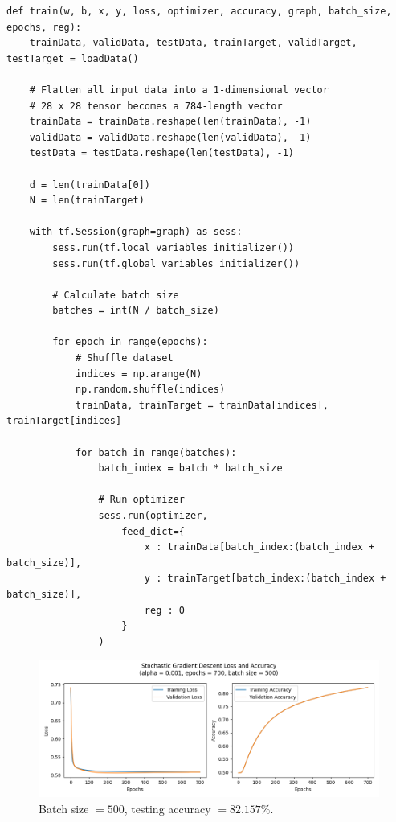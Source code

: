 \documentclass[letter]{article}
\begin{document}
\begin{lstlisting}
def train(w, b, x, y, loss, optimizer, accuracy, graph, batch_size, epochs, reg):
    trainData, validData, testData, trainTarget, validTarget, testTarget = loadData()

    # Flatten all input data into a 1-dimensional vector
    # 28 x 28 tensor becomes a 784-length vector
    trainData = trainData.reshape(len(trainData), -1)
    validData = validData.reshape(len(validData), -1)
    testData = testData.reshape(len(testData), -1)

    d = len(trainData[0])
    N = len(trainTarget)

    with tf.Session(graph=graph) as sess:
        sess.run(tf.local_variables_initializer())
        sess.run(tf.global_variables_initializer())

        # Calculate batch size
        batches = int(N / batch_size)

        for epoch in range(epochs):
            # Shuffle dataset
            indices = np.arange(N)
            np.random.shuffle(indices)
            trainData, trainTarget = trainData[indices], trainTarget[indices]

            for batch in range(batches):
                batch_index = batch * batch_size

                # Run optimizer
                sess.run(optimizer,
                    feed_dict={
                        x : trainData[batch_index:(batch_index + batch_size)], 
                        y : trainTarget[batch_index:(batch_index + batch_size)],
                        reg : 0
                    }
                )
\end{lstlisting}

\begin{figure}[H]
	\centering
	\includegraphics[width=\linewidth]{Figure_7}
	\caption{Batch size $ = 500$, testing accuracy $ = 82.157\%$.}
	\label{fig:plot7}
\end{figure}
\end{document}
